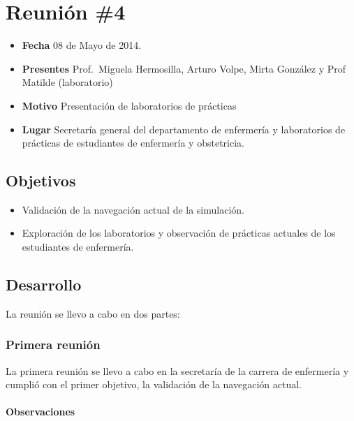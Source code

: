 \section{Reunión \#4}

\begin{itemize}
\itemsep1pt\parskip0pt
\item
  \textbf{Fecha} 08 de Mayo de 2014.
\item
  \textbf{Presentes} Prof.~Miguela Hermosilla, Arturo Volpe, Mirta
  González y Prof Matilde (laboratorio)
\item
  \textbf{Motivo} Presentación de laboratorios de prácticas
\item
  \textbf{Lugar} Secretaría general del departamento de enfermería y
  laboratorios de prácticas de estudiantes de enfermería y obstetricia.
\end{itemize}

\subsection{Objetivos}

\begin{itemize}
\itemsep1pt\parskip0pt
\item
  Validación de la navegación actual de la simulación.
\item
  Exploración de los laboratorios y observación de prácticas actuales de
  los estudiantes de enfermería.
\end{itemize}

\subsection{Desarrollo}

La reunión se llevo a cabo en dos partes:

\subsubsection{Primera reunión}

La primera reunión se llevo a cabo en la secretaría de la carrera de
enfermería y cumplió con el primer objetivo, la validación de la
navegación actual.

\paragraph{Observaciones}

